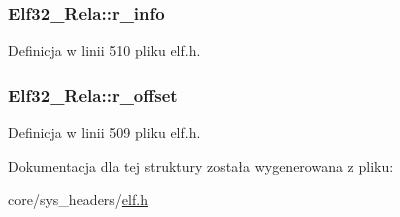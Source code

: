 \hypertarget{struct_elf32___rela_ac3a79d3f04209c33ddb4c36d07e68a79}{
\subsubsection[{r\-\_\-info}]{ Elf32\-\_\-\-Rela\-::r\-\_\-info}}\label{struct_elf32___rela_ac3a79d3f04209c33ddb4c36d07e68a79}


Definicja w linii 510 pliku elf.\-h.

\hypertarget{struct_elf32___rela_aa850a306ee7fa3935a9f8c3d1aae4e51}{
\subsubsection[{r\-\_\-offset}]{ Elf32\-\_\-\-Rela\-::r\-\_\-offset}}\label{struct_elf32___rela_aa850a306ee7fa3935a9f8c3d1aae4e51}


Definicja w linii 509 pliku elf.\-h.



Dokumentacja dla tej struktury została wygenerowana z pliku\-:\begin{DoxyCompactItemize}
\item 
core/sys\-\_\-headers/\hyperlink{elf_8h}{elf.\-h}\end{DoxyCompactItemize}
